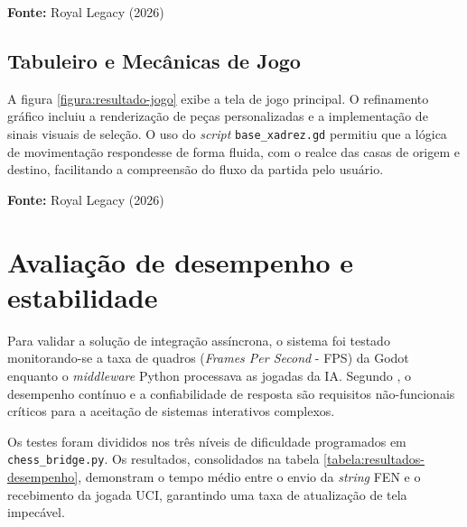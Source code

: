 \begin{center}
	\vspace{-0.2cm} %
	\small \textbf{Fonte:} Royal Legacy (2026)
\end{center}

\subsection{Tabuleiro e Mecânicas de Jogo}

A figura \ref{figura:resultado-jogo} exibe a tela de jogo principal. O refinamento gráfico incluiu a renderização de peças personalizadas e a implementação de sinais visuais de seleção. O uso do \textit{script} \texttt{base\_xadrez.gd} \cite{RoyalLegacy2026} permitiu que a lógica de movimentação respondesse de forma fluida, com o realce das casas de origem e destino, facilitando a compreensão do fluxo da partida pelo usuário.

\begin{center}
	\vspace{-0.2cm} %
	\small \textbf{Fonte:} Royal Legacy (2026)
\end{center}

\section{Avaliação de desempenho e estabilidade}
\label{secao:avaliacao-desempenho}

Para validar a solução de integração assíncrona, o sistema foi testado monitorando-se a taxa de quadros (\textit{Frames Per Second} - FPS) da Godot enquanto o \textit{middleware} Python processava as jogadas da IA. Segundo , o desempenho contínuo e a confiabilidade de resposta são requisitos não-funcionais críticos para a aceitação de sistemas interativos complexos.

Os testes foram divididos nos três níveis de dificuldade programados em \texttt{chess\_bridge.py}. Os resultados, consolidados na tabela \ref{tabela:resultados-desempenho}, demonstram o tempo médio entre o envio da \textit{string} FEN e o recebimento da jogada UCI, garantindo uma taxa de atualização de tela impecável.

